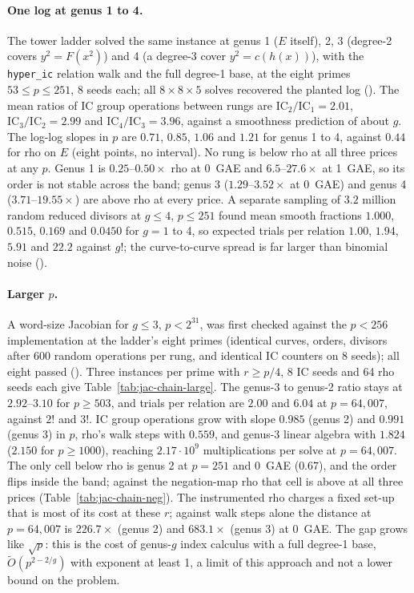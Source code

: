 \paragraph{One log at genus 1 to 4.} The tower ladder solved the same
instance at genus 1 ($E$ itself), 2, 3 (degree-2 covers $y^2=F(x^2)$) and 4
(a degree-3 cover $y^2=c(h(x))$), with the \texttt{hyper\_ic} relation walk
and the full degree-1 base, at the eight primes $53\le p\le251$, 8 seeds
each; all $8\times8\times5$ solves recovered the planted log
().
The mean ratios of IC group operations between rungs are
$\mathrm{IC}_2/\mathrm{IC}_1=2.01$, $\mathrm{IC}_3/\mathrm{IC}_2=2.99$ and
$\mathrm{IC}_4/\mathrm{IC}_3=3.96$, against a smoothness prediction of about
$g$. The log-log slopes in $p$ are $0.71$, $0.85$, $1.06$ and $1.21$ for
genus 1 to 4, against $0.44$ for rho on $E$ (eight points, no interval). No
rung is below rho at all three prices at any $p$. Genus 1 is $0.25$--$0.50\times$
rho at 0~GAE and $6.5$--$27.6\times$ at 1~GAE, so its order is not stable across
the band; genus 3 ($1.29$--$3.52\times$ at 0~GAE) and genus 4
($3.71$--$19.55\times$) are above rho at every price. A separate sampling of
$3.2$ million random reduced divisors at $g\le4$, $p\le251$ found mean
smooth fractions $1.000$, $0.515$, $0.169$ and $0.0450$ for $g=1$ to 4, so
expected trials per relation $1.00$, $1.94$, $5.91$ and $22.2$ against $g!$; the
curve-to-curve spread is far larger than binomial noise
().

\paragraph{Larger $p$.} A word-size Jacobian for $g\le3$, $p<2^{31}$, was
first checked against the $p<256$ implementation at the ladder's eight
primes (identical curves, orders, divisors after 600 random operations per
rung, and identical IC counters on 8 seeds); all eight passed
().
Three instances per prime with $r\ge p/4$, 8 IC seeds and 64 rho seeds each
give Table~\ref{tab:jac-chain-large}. The genus-3 to genus-2 ratio stays at
$2.92$--$3.10$ for $p\ge503$, and trials per relation are $2.00$ and $6.04$ at
$p=64{,}007$, against $2!$ and $3!$. IC group operations grow with slope
$0.985$ (genus 2) and $0.991$ (genus 3) in $p$, rho's walk steps with $0.559$,
and genus-3 linear algebra with $1.824$ ($2.150$ for $p\ge1000$), reaching
$2.17\cdot10^9$ multiplications per solve at $p=64{,}007$. The only cell
below rho is genus 2 at $p=251$ and 0~GAE ($0.67$), and the order flips
inside the band; against the negation-map rho that cell is above at all
three prices (Table~\ref{tab:jac-chain-neg}). The instrumented rho charges a fixed set-up that is most of
its cost at these $r$; against walk steps alone the distance at
$p=64{,}007$ is $226.7\times$ (genus 2) and $683.1\times$ (genus 3) at 0~GAE.
The gap grows like $\sqrt p$: this is the cost of genus-$g$ index calculus
with a full degree-1 base, $\tilde O(p^{2-2/g})$ with exponent at least 1, a
limit of this approach and not a lower bound on the problem.


